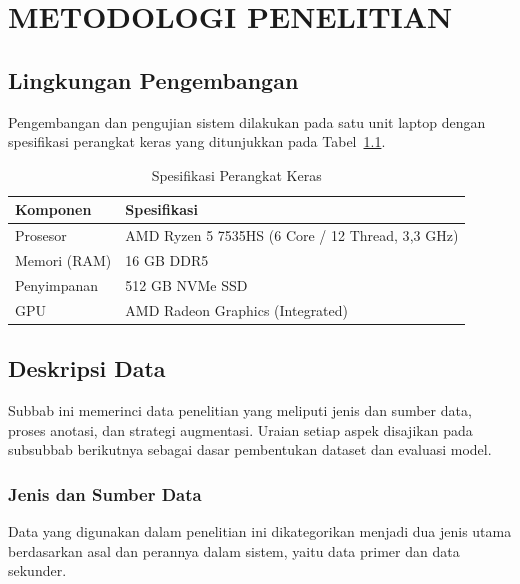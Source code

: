 \chapter{METODOLOGI PENELITIAN}
\label{chap:metodologi}

\section{Lingkungan Pengembangan}
Pengembangan dan pengujian sistem dilakukan pada satu unit laptop dengan spesifikasi perangkat keras yang ditunjukkan pada Tabel~\ref{tab:spek-hardware}.

\begin{table}[h]
  \centering
  \caption{Spesifikasi Perangkat Keras}
  \label{tab:spek-hardware}
  \footnotesize
  \setlength{\tabcolsep}{4pt}
  \begin{tabular}{p{} p{}}
    \toprule
    \textbf{Komponen} & \textbf{Spesifikasi} \\
    \midrule
    Prosesor            & AMD Ryzen 5 7535HS (6 Core / 12 Thread, 3{,}3 GHz) \\
    Memori (RAM)        & 16 GB DDR5 \\
    Penyimpanan         & 512 GB NVMe SSD \\
    GPU                 & AMD Radeon Graphics (Integrated) \\
    \bottomrule
  \end{tabular}
\end{table}

\section{Deskripsi Data}
Subbab ini memerinci data penelitian yang meliputi jenis dan sumber data, proses anotasi, dan strategi augmentasi. Uraian setiap aspek disajikan pada subsubbab berikutnya sebagai dasar pembentukan dataset dan evaluasi model.
\subsection{Jenis dan Sumber Data}
Data yang digunakan dalam penelitian ini dikategorikan menjadi dua jenis utama berdasarkan asal dan perannya dalam sistem, yaitu data primer dan data sekunder.

